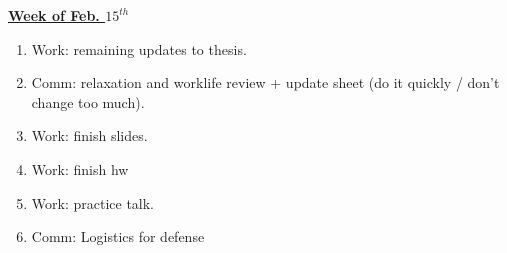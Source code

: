 \documentclass[11pt]{article}
\begin{document}
           {\small \underline{\textbf{Week of Feb. $15^{th}$}} }\\
           \begin{enumerate}
           \item \small Work: remaining updates to thesis. 
           \item \small Comm: relaxation and worklife review + update
             sheet  (do it quickly / don't change too much). 
           \item \small Work: finish slides. 
           \item \small Work: finish hw
           \item \small Work: practice talk. 
             \small \item \small Comm: Logistics for defense
           \end{enumerate}
           \newpage
         
\end{document}

